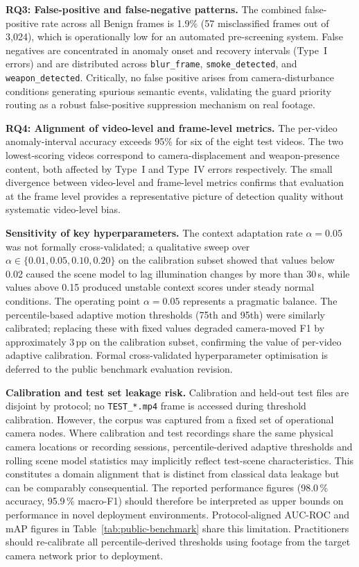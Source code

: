 \documentclass[sensors,article,submit,pdftex,moreauthors]{Definitions/mdpi}
\begin{document}
\textbf{RQ3: False-positive and false-negative patterns.} The combined false-positive rate across all Benign frames is 1.9\% (57 misclassified frames out of 3{,}024), which is operationally low for an automated pre-screening system. False negatives are concentrated in anomaly onset and recovery intervals (Type~I errors) and are distributed across \texttt{blur\_frame}, \texttt{smoke\_detected}, and \texttt{weapon\_detected}. Critically, no false positive arises from camera-disturbance conditions generating spurious semantic events, validating the guard priority routing as a robust false-positive suppression mechanism on real footage.
 
\textbf{RQ4: Alignment of video-level and frame-level metrics.} The per-video anomaly-interval accuracy exceeds 95\% for six of the eight test videos. The two lowest-scoring videos correspond to camera-displacement and weapon-presence content, both affected by Type~I and Type~IV errors respectively. The small divergence between video-level and frame-level metrics confirms that evaluation at the frame level provides a representative picture of detection quality without systematic video-level bias.
 
\textbf{Sensitivity of key hyperparameters.} The context adaptation rate $\alpha = 0.05$ was not formally cross-validated; a qualitative sweep over $\alpha \in \{0.01, 0.05, 0.10, 0.20\}$ on the calibration subset showed that values below 0.02 caused the scene model to lag illumination changes by more than 30\,s, while values above 0.15 produced unstable context scores under steady normal conditions. The operating point $\alpha = 0.05$ represents a pragmatic balance. The percentile-based adaptive motion thresholds (75th and 95th) were similarly calibrated; replacing these with fixed values degraded camera-moved F1 by approximately 3\,pp on the calibration subset, confirming the value of per-video adaptive calibration. Formal cross-validated hyperparameter optimisation is deferred to the public benchmark evaluation revision.
 
\textbf{Calibration and test set leakage risk.}
Calibration and held-out test files are disjoint by protocol; no \texttt{TEST\_*.mp4} frame is accessed during threshold calibration. However, the corpus was captured from a fixed set of operational camera nodes. Where calibration and test recordings share the same physical camera locations or recording sessions, percentile-derived adaptive thresholds and rolling scene model statistics may implicitly reflect test-scene characteristics. This constitutes a domain alignment that is distinct from classical data leakage but can be comparably consequential. The reported performance figures (98.0\,\% accuracy, 95.9\,\% macro-F1) should therefore be interpreted as upper bounds on performance in novel deployment environments. Protocol-aligned AUC-ROC and mAP figures in Table~\ref{tab:public-benchmark} share this limitation. Practitioners should re-calibrate all percentile-derived thresholds using footage from the target camera network prior to deployment.
 
\end{document}

